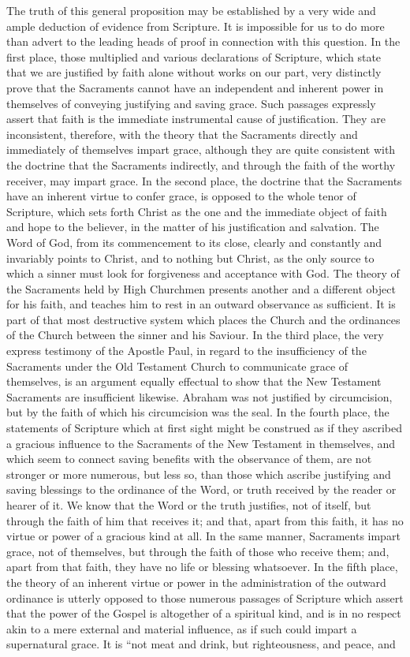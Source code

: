 \documentclass[]{book}
\begin{document}
The truth of this general proposition may be established by a very wide and ample deduction of evidence from Scripture. It is impossible for us to do more than advert to the leading heads of proof in connection with this question. In the first place, those multiplied and various declarations of Scripture, which state that we are justified by faith alone without works on our part, very distinctly prove that the Sacraments cannot have an independent and inherent power in themselves of conveying justifying and saving grace. Such passages expressly assert that faith is the immediate instrumental cause of justification. They are inconsistent, therefore, with the theory that the Sacraments directly and immediately of themselves impart grace, although they are quite consistent with the doctrine that the Sacraments indirectly, and through the faith of the worthy receiver, may impart grace. In the second place, the doctrine that the Sacraments have an inherent virtue to confer grace, is opposed to the whole tenor of Scripture, which sets forth Christ as the one and the immediate object of faith and hope to the believer, in the matter of his justification and salvation. The Word of God, from its commencement to its close, clearly and constantly and invariably points to Christ, and to nothing but Christ, as the only source to which a sinner must look for forgiveness and acceptance with God. The theory of the Sacraments held by High Churchmen presents another and a different object for his faith, and teaches him to rest in an outward observance as sufficient. It is part of that most destructive system which places the Church and the ordinances of the Church between the sinner and his Saviour. In the third place, the very express testimony of the Apostle Paul, in regard to the insufficiency of the Sacraments under the Old Testament Church to communicate grace of themselves, is an argument equally effectual to show that the New Testament Sacraments are insufficient likewise. Abraham was not justified by circumcision, but by the faith of which his circumcision was the seal. In the fourth place, the statements of Scripture which at first sight might be construed as if they ascribed a gracious influence to the Sacraments of the New Testament in themselves, and which seem to connect saving benefits with the observance of them, are not stronger or more numerous, but less so, than those which ascribe justifying and saving blessings to the ordinance of the Word, or truth received by the reader or hearer of it. We know that the Word or the truth justifies, not of itself, but through the faith of him that receives it; and that, apart from this faith, it has no virtue or power of a gracious kind at all. In the same manner, Sacraments impart grace, not of themselves, but through the faith of those who receive them; and, apart from that faith, they have no life or blessing whatsoever. In the fifth place, the theory of an inherent virtue or power in the administration of the outward ordinance is utterly opposed to those numerous passages of Scripture which assert that the power of the Gospel is altogether of a spiritual kind, and is in no respect akin to a mere external and material influence, as if such could impart a supernatural grace. It is ``not meat and drink, but righteousness, and peace, and 
\end{document}
